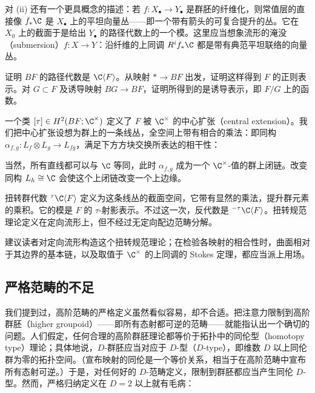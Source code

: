 对 (ii) 还有一个更具概念的描述：若 $f\colon X_\bullet\to Y_\bullet$ 是群胚的纤维化，则常值层的直接像 $f_*\C$ 是 $X_\bullet$ 上的平坦向量丛——即一个带有箭头的可复合提升的丛。它在 $X_0$ 上的截面于是给出 $Y_\bullet$ 的路径代数上的一个模。这里应当想象流形的淹没（submersion）$f\colon X\to Y$：沿纤维的上同调 $R^if_*\C$ 都是带有典范平坦联络的向量丛。

\begin{exercise}
证明 $BF$ 的路径代数是 $\C\langle F\rangle$。从映射 $*\to BF$ 出发，证明这样得到 $F$ 的正则表示。对 $G\subset F$ 及诱导映射 $BG\to BF$，证明所得到的是诱导表示，即 $F/G$ 上的函数。
\end{exercise}

\begin{remark}[扭转规范理论]
一个类 $[\tau]\in H^2(BF;\C^\times)$ 定义了 $F$ 被 $\C^\times$ 的中心扩张（central extension）。我们把中心扩张设想为群上的一条线丛，全空间上带有相合的乘法：即同构 $\alpha_{f,g}\colon L_f\otimes L_g\to L_{fg}$，满足下方方块交换所表达的相干性：

\begin{center}
\end{center}

当然，所有直线都可以与 $\C$ 等同，此时 $\alpha_{f,g}$ 成为一个 $\C^\times$-值的群上闭链。改变同构 $L_h\cong\C$ 会使这个上闭链改变一个上边缘。

扭转群代数 ${}^\tau\C\langle F\rangle$ 定义为这条线丛的截面空间，它带有显然的乘法，提升群元素的乘积。它的模是 $F$ 的 $\tau$-射影表示。不过这一次，反代数是 ${}^{-\tau}\C\langle F\rangle$。扭转规范理论定义在定向流形上，但不经过无定向配边范畴分解。

建议读者对定向流形构造这个扭转规范理论；在检验各映射的相合性时，曲面相对于其边界的基本链，以及取值于 $\C^\times$ 的上同调的 Stokes 定理，都应当派上用场。
\end{remark}

\subsection{严格范畴的不足}

我们提到过，高阶范畴的严格定义虽然看似容易，却不合适。把注意力限制到高阶群胚（higher groupoid）——即所有态射都可逆的范畴——就能指认出一个确切的问题。人们假定，任何合理的高阶群胚理论都等价于拓扑中的同伦型（homotopy type）理论；具体地说，$D$-群胚应当对应于 $D$-型（$D$-type），即维数 $D$ 以上同伦群为零的拓扑空间。（宣布映射的同伦是一个等价关系，相当于在高阶范畴中宣布所有态射可逆。）于是，对任何好的 $D$-范畴定义，限制到群胚都应当产生同伦 $D$-型。然而，严格归纳定义在 $D=2$ 以上就有毛病：

